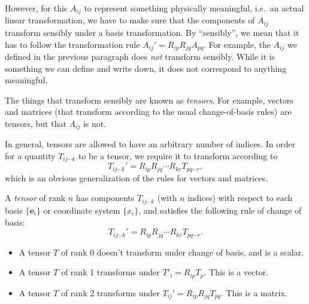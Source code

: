 \documentclass[a4paper]{article}
\begin{document}
However, for this $A_{ij}$ to represent something physically meaningful, i.e.\ an actual linear transformation, we have to make sure that the components of $A_{ij}$ transform sensibly under a basis transformation. By ``sensibly'', we mean that it has to follow the transformation rule $A_{ij}' = R_{ip}R_{jq}A_{pq}$. For example, the $A_{ij}$ we defined in the previous paragraph does \emph{not} transform sensibly. While it is something we can define and write down, it does not correspond to anything meaningful.

The things that transform sensibly are known as \emph{tensors}. For example, vectors and matrices (that transform according to the usual change-of-basis rules) are tensors, but that $A_{ij}$ is not.

In general, tensors are allowed to have an arbitrary number of indices. In order for a quantity $T_{ij\cdots k}$ to be a tensor, we require it to transform according to
\[
  T_{ij\cdots k}' = R_{ip}R_{jq}\cdots R_{kr}T_{pq\cdots r},
\]
which is an obvious generalization of the rules for vectors and matrices.

\begin{defi}[Tensor]
  A \emph{tensor} of rank $n$ has components $T_{ij\cdots k}$ (with $n$ indices) with respect to each basis $\{\mathbf{e}_i\}$ or coordinate system $\{x_i\}$, and satisfies the following rule of change of basis:
  \[
    T_{ij\cdots k}' = R_{ip}R_{jq}\cdots R_{kr}T_{pq\cdots r}.
  \]
\end{defi}

\begin{eg}\leavevmode
  \begin{itemize}
    \item A tensor $T$ of rank 0 doesn't transform under change of basis, and is a scalar.
    \item A tensor $T$ of rank 1 transforms under $T'_i = R_{ip}T_p$. This is a vector.
    \item A tensor $T$ of rank 2 transforms under $T_{ij}' = R_{ip} R_{jq} T_{pq}$. This is a matrix.
  \end{itemize}
\end{eg}
\end{document}
